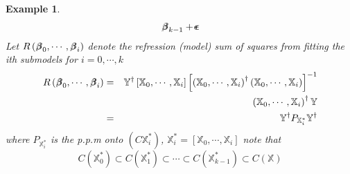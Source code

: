\documentclass{article}
\newtheorem{example}[theorem]{Example}
\begin{document}
\begin{example}
\begin{eqnarray*}
\beta\mkern-9.6mu \beta%
_{k-1}+%
\epsilon\mkern-10mu \epsilon%
\end{eqnarray*}%
\newline
\newline
Let $R\left( 
\beta\mkern-9.6mu \beta%
_{0},\cdots ,%
\beta\mkern-9.6mu \beta%
_{i}\right) $ denote the refression (model) sum of squares from fitting the
ith submodels for $i=0,\cdots ,k$%
\begin{eqnarray*}
R\left( 
\beta\mkern-9.6mu \beta%
_{0},\cdots ,%
\beta\mkern-9.6mu \beta%
_{i}\right)  &=&\mathbb{Y}^{\dagger }\left[ \mathbb{X}_{0},\cdots ,\mathbb{X}%
_{i}\right] \left[ \left( \mathbb{X}_{0},\cdots ,\mathbb{X}_{i}\right)
^{\dagger }\left( \mathbb{X}_{0},\cdots ,\mathbb{X}_{i}\right) \right] ^{-1}
\\
&&\left( \mathbb{X}_{0},\cdots ,\mathbb{X}_{i}\right) ^{\dagger }\mathbb{Y}
\\
&=&\mathbb{Y}^{\dagger }P_{\mathbb{X}_{i}^{\ast }}\mathbb{Y}^{\dagger }
\end{eqnarray*}%
where $P_{\mathbb{X}_{i}^{\ast }}$ is the p.p.m onto $\left( C\mathbb{X}%
_{i}^{\ast }\right) $, $\mathbb{X}_{i}^{\ast }=\left[ \mathbb{X}_{0},\cdots ,%
\mathbb{X}_{i}\right] $\newline
\newline
note that%
\begin{equation*}
C\left( \mathbb{X}_{0}^{\ast }\right) \subset C\left( \mathbb{X}_{1}^{\ast
}\right) \subset \cdots \subset C\left( \mathbb{X}_{k-1}^{\ast }\right)
\subset C\left( \mathbb{X}\right) 
\end{equation*}
\end{example}
\end{document}
